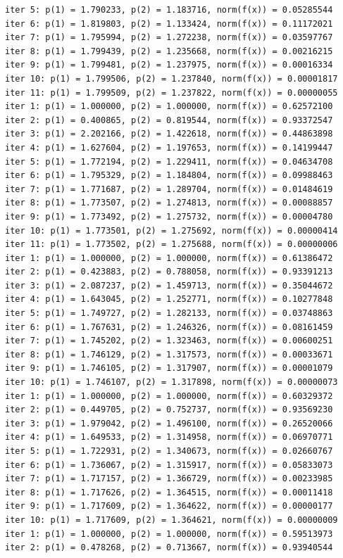 \documentclass[12pt]{article}
\begin{document}
\begin{tiny}
\begin{verbatim}
iter 5: p(1) = 1.790233, p(2) = 1.183716, norm(f(x)) = 0.05285544
iter 6: p(1) = 1.819803, p(2) = 1.133424, norm(f(x)) = 0.11172021
iter 7: p(1) = 1.795994, p(2) = 1.272238, norm(f(x)) = 0.03597767
iter 8: p(1) = 1.799439, p(2) = 1.235668, norm(f(x)) = 0.00216215
iter 9: p(1) = 1.799481, p(2) = 1.237975, norm(f(x)) = 0.00016334
iter 10: p(1) = 1.799506, p(2) = 1.237840, norm(f(x)) = 0.00001817
iter 11: p(1) = 1.799509, p(2) = 1.237822, norm(f(x)) = 0.00000055
iter 1: p(1) = 1.000000, p(2) = 1.000000, norm(f(x)) = 0.62572100
iter 2: p(1) = 0.400865, p(2) = 0.819544, norm(f(x)) = 0.93372547
iter 3: p(1) = 2.202166, p(2) = 1.422618, norm(f(x)) = 0.44863898
iter 4: p(1) = 1.627604, p(2) = 1.197653, norm(f(x)) = 0.14199447
iter 5: p(1) = 1.772194, p(2) = 1.229411, norm(f(x)) = 0.04634708
iter 6: p(1) = 1.795329, p(2) = 1.184804, norm(f(x)) = 0.09988463
iter 7: p(1) = 1.771687, p(2) = 1.289704, norm(f(x)) = 0.01484619
iter 8: p(1) = 1.773507, p(2) = 1.274813, norm(f(x)) = 0.00088857
iter 9: p(1) = 1.773492, p(2) = 1.275732, norm(f(x)) = 0.00004780
iter 10: p(1) = 1.773501, p(2) = 1.275692, norm(f(x)) = 0.00000414
iter 11: p(1) = 1.773502, p(2) = 1.275688, norm(f(x)) = 0.00000006
iter 1: p(1) = 1.000000, p(2) = 1.000000, norm(f(x)) = 0.61386472
iter 2: p(1) = 0.423883, p(2) = 0.788058, norm(f(x)) = 0.93391213
iter 3: p(1) = 2.087237, p(2) = 1.459713, norm(f(x)) = 0.35044672
iter 4: p(1) = 1.643045, p(2) = 1.252771, norm(f(x)) = 0.10277848
iter 5: p(1) = 1.749727, p(2) = 1.282133, norm(f(x)) = 0.03748863
iter 6: p(1) = 1.767631, p(2) = 1.246326, norm(f(x)) = 0.08161459
iter 7: p(1) = 1.745202, p(2) = 1.323463, norm(f(x)) = 0.00600251
iter 8: p(1) = 1.746129, p(2) = 1.317573, norm(f(x)) = 0.00033671
iter 9: p(1) = 1.746105, p(2) = 1.317907, norm(f(x)) = 0.00001079
iter 10: p(1) = 1.746107, p(2) = 1.317898, norm(f(x)) = 0.00000073
iter 1: p(1) = 1.000000, p(2) = 1.000000, norm(f(x)) = 0.60329372
iter 2: p(1) = 0.449705, p(2) = 0.752737, norm(f(x)) = 0.93569230
iter 3: p(1) = 1.979042, p(2) = 1.496100, norm(f(x)) = 0.26520066
iter 4: p(1) = 1.649533, p(2) = 1.314958, norm(f(x)) = 0.06970771
iter 5: p(1) = 1.722931, p(2) = 1.340673, norm(f(x)) = 0.02660767
iter 6: p(1) = 1.736067, p(2) = 1.315917, norm(f(x)) = 0.05833073
iter 7: p(1) = 1.717157, p(2) = 1.366729, norm(f(x)) = 0.00233985
iter 8: p(1) = 1.717626, p(2) = 1.364515, norm(f(x)) = 0.00011418
iter 9: p(1) = 1.717609, p(2) = 1.364622, norm(f(x)) = 0.00000177
iter 10: p(1) = 1.717609, p(2) = 1.364621, norm(f(x)) = 0.00000009
iter 1: p(1) = 1.000000, p(2) = 1.000000, norm(f(x)) = 0.59513973
iter 2: p(1) = 0.478268, p(2) = 0.713667, norm(f(x)) = 0.93940544

\end{verbatim}
\end{tiny}
\end{document}
